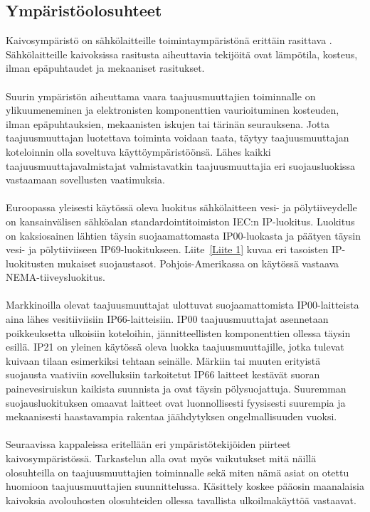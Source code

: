 \documentclass[finnish,12pt,a4paper,pdftex,elec,utf8]{aaltothesis}
\begin{document}
\subsection{Ympäristöolosuhteet}
Kaivosympäristö on sähkölaitteille toimintaympäristönä erittäin rasittava \cite[s. 251]{Hakapää}. Sähkölaitteille kaivoksissa rasitusta aiheuttavia tekijöitä ovat lämpötila, kosteus, ilman epäpuhtaudet ja mekaaniset rasitukset.
\\\\
Suurin ympäristön aiheuttama vaara taajuusmuuttajien toiminnalle on ylikuumeneminen ja elektronisten komponenttien vaurioituminen kosteuden, ilman  epäpuhtauksien, mekaanisten iskujen tai tärinän seurauksena. Jotta taajuusmuuttajan luotettava toiminta voidaan taata, täytyy taajuusmuuttajan koteloinnin olla soveltuva käyttöympäristöönsä. Lähes kaikki taajuusmuuttajavalmistajat valmistavatkin taajuusmuuttajia eri suojausluokissa vastaamaan sovellusten vaatimuksia.
\\\\
Euroopassa yleisesti käytössä oleva luokitus sähkölaitteen vesi- ja pölytiiveydelle on kansainvälisen sähköalan standardointitoimiston IEC:n IP-luokitus. Luokitus on kaksiosainen lähtien täysin suojaamattomasta IP00-luokasta ja päätyen täysin vesi- ja pölytiiviiseen IP69-luokitukseen. Liite~\ref{Liite 1} kuvaa eri tasoisten IP-luokitusten mukaiset suojaustasot. Pohjois-Amerikassa on käytössä vastaava NEMA-tiiveysluokitus.
\\\\
Markkinoilla olevat taajuusmuuttajat ulottuvat suojaamattomista IP00-laitteista aina lähes vesitiiviisiin IP66-laitteisiin. IP00 taajuusmuuttajat asennetaan poikkeuksetta ulkoisiin koteloihin, jännitteellisten komponenttien ollessa täysin esillä. IP21 on yleinen käytössä oleva luokka taajuusmuuttajille, jotka tulevat kuivaan tilaan esimerkiksi tehtaan seinälle. Märkiin tai muuten erityistä suojausta vaativiin sovelluksiin tarkoitetut IP66 laitteet kestävät suoran painevesiruiskun kaikista suunnista ja ovat täysin pölysuojattuja. Suuremman suojausluokituksen omaavat laitteet ovat luonnollisesti fyysisesti suurempia ja mekaanisesti haastavampia rakentaa jäähdytyksen ongelmallisuuden vuoksi.
\\\\
Seuraavissa kappaleissa eritellään eri ympäristötekijöiden piirteet kaivosympäristössä. Tarkastelun alla ovat myös vaikutukset mitä näillä olosuhteilla on taajuusmuuttajien toiminnalle sekä miten nämä asiat on otettu huomioon taajuusmuuttajien suunnittelussa. Käsittely koskee pääosin maanalaisia kaivoksia avolouhosten olosuhteiden ollessa tavallista ulkoilmakäyttöä vastaavat. %
\end{document}
